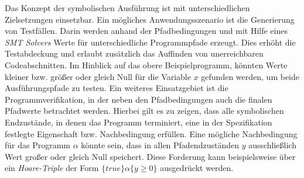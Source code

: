 Das Konzept der symbolischen Ausführung ist mit unterschiedlichen Zielsetzungen einsetzbar. Ein mögliches Anwendungsszenario ist die Generierung von Testfällen. Darin werden anhand der Pfadbedingungen und mit Hilfe eines \emph{SMT Solvers} Werte für unterschiedliche Programmpfade erzeugt. Dies erhöht die Testabdeckung und erlaubt zusätzlich das Auffinden von unerreichbaren Codeabschnitten. Im Hinblick auf das obere Beispielprogramm, könnten Werte kleiner bzw. größer oder gleich Null für die Variable $x$ gefunden werden, um beide Ausführungspfade zu testen. Ein weiteres Einsatzgebiet ist die Programmverifikation, in der neben den Pfadbedingungen auch die finalen Pfadwerte betrachtet werden. Hierbei gilt es zu zeigen, dass alle symbolischen Endzustände, in denen das Programm terminiert, eine in der Spezifikation festlegte Eigenschaft bzw. Nachbedingung erfüllen. Eine mögliche Nachbedingung für das Programm $\alpha$ könnte sein, dass in allen Pfadendzuständen $y$ ausschließlich Wert großer oder gleich Null speichert. Diese Forderung kann beispielsweise über ein \emph{Hoare-Triple} der Form $\{true\}\alpha\{y \geq 0\}$ ausgedrückt werden.